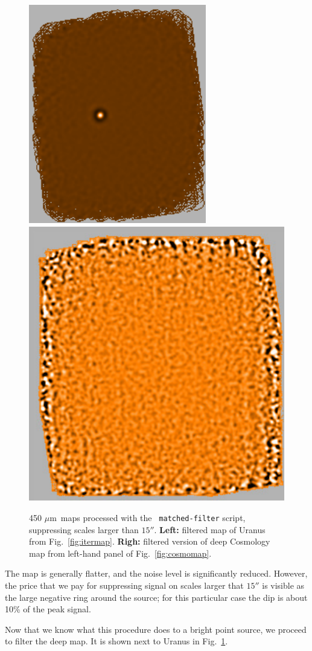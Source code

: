 \documentclass[twoside,11pt]{article}
\newcommand{\micron}{\mbox{\,${\mu}$m}}            %
\renewcommand{\_}{\texttt{\symbol{95}}}
\begin{document}
\begin{figure}
\begin{center}
\includegraphics[width=0.46\linewidth]{sc19_uranus_filt}
\includegraphics[width=0.525\linewidth]{sc19_cosmo_map_filt}
\caption{450\,\micron\ maps processed with the \texttt{
    matched-filter} script, suppressing scales larger than
  $15''$. {\bf Left:} filtered map of Uranus from
  Fig.~\ref{fig:itermap}. {\bf Righ:} filtered version of deep
  Cosmology map from left-hand panel of Fig.~\ref{fig:cosmomap}.}
\label{fig:cosmo_filt}
\end{center}
\end{figure}

The map is generally flatter, and the noise level is significantly
reduced. However, the price that we pay for suppressing signal on
scales larger that $15''$ is visible as the large negative ring around
the source; for this particular case the dip is about 10\% of the peak
signal.

Now that we know what this procedure does to a bright point source, we
proceed to filter the deep map. It is shown next to Uranus in
Fig.~\ref{fig:cosmo_filt}.
\end{document}
